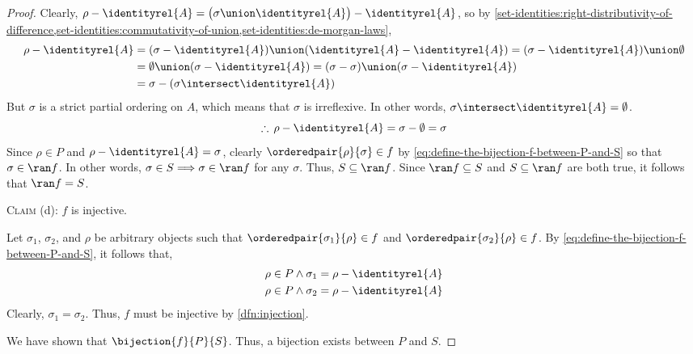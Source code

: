 \begin{proof}
    Clearly, \( \rho - \identityrel{A} = \big( \sigma \union \identityrel{A} \big) - \identityrel{A} \), so by
    \cref{set-identities:right-distributivity-of-difference,set-identities:commutativity-of-union,set-identities:de-morgan-laws},
    \begin{align*}
        \rho - \identityrel{A}
        &= \mleft( \sigma - \identityrel{A} \mright) \union \mleft( \identityrel{A} - \identityrel{A} \mright)
        = \mleft( \sigma - \identityrel{A} \mright) \union \emptyset\\
        &= \emptyset \union \mleft( \sigma - \identityrel{A} \mright)
        = \mleft( \sigma - \sigma \mright) \union \mleft( \sigma - \identityrel{A} \mright)\\
        &= \sigma - \mleft( \sigma \intersect \identityrel{A} \mright)
    \end{align*}
    But \( \sigma \) is a strict partial ordering on \( A \), which means that \( \sigma \) is irreflexive. In other words, \( \sigma \intersect \identityrel{A} = \emptyset \).
    \begin{equation*}
        \therefore \, \rho - \identityrel{A} = \sigma - \emptyset = \sigma
    \end{equation*}
    Since \( \rho \in P \) and \( \rho - \identityrel{A} = \sigma \), clearly \( \orderedpair{\rho}{\sigma} \in f \)
    by \eqref{eq:define-the-bijection-f-between-P-and-S} so that \( \sigma \in \ran f \).
    In other words, \( \sigma \in S {\implies} \sigma \in \ran f \) for any \( \sigma \). Thus, \( S \subseteq \ran f \).
    Since \( \ran f \subseteq S \) and \( S \subseteq \ran f \) are both true, it follows that \( \ran f = S \).

    \vspace{0.5cm}
    \noindent
    {\scshape Claim} (d): \( f \) is injective.

    \vspace{0.2cm}
    \noindent
    Let \( \sigma_{1} \), \( \sigma_{2} \), and \( \rho \) be arbitrary objects such that
    \( \orderedpair{\sigma_{1}}{\rho} \in f \) and \( \orderedpair{\sigma_{2}}{\rho} \in f \).
    By \eqref{eq:define-the-bijection-f-between-P-and-S}, it follows that,
    \begin{gather*}
        \rho \in P \land \sigma_{1} = \rho - \identityrel{A}\\
        \rho \in P \land \sigma_{2} = \rho - \identityrel{A}
    \end{gather*}
    Clearly, \( \sigma_{1} = \sigma_{2} \). Thus, \( f \) must be injective by \cref{dfn:injection}.

    \vspace{0.3cm}
    \noindent
    We have shown that \( \bijection{f}{P}{S} \). Thus, a bijection exists between \( P \) and \( S \).
\end{proof}

